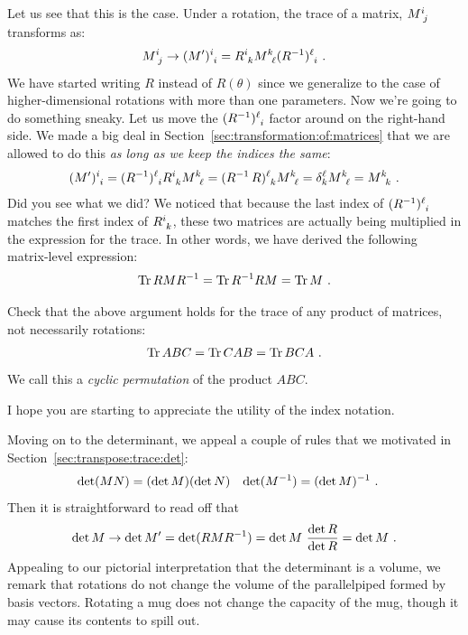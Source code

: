 \documentclass[12pt]{article}
\begin{document}
Let us see that this is the case. Under a rotation, the trace of a matrix, $M\aij{i}{j}$ transforms as:
\begin{align}
    M\aij{i}{j} \to (M')\aij{i}{i} = R\aij{i}{k} M\aij{k}{\ell} (R\inv)\aij{\ell}{i} \ .
\end{align}
We have started writing $R$ instead of $R(\theta)$ since we generalize to the case of higher-dimensional rotations with more than one parameters. Now we're going to do something sneaky. Let us move the $(R\inv)\aij{\ell}{i}$ factor around on the right-hand side. We made a big deal in Section~\ref{sec:transformation:of:matrices} that we are allowed to do this \emph{as long as we keep the indices the same}:
\begin{align}
    (M')\aij{i}{i}
    =
    (R\inv)\aij{\ell}{i} R\aij{i}{k} M\aij{k}{\ell} 
    = (R\inv\, R)\aij{\ell}{k} M\aij{k}{\ell} 
    = \delta^\ell_k M\aij{k}{\ell} 
    = M\aij{k}{k} \ . 
\end{align}
Did you see what we did? We noticed that because the last index of $(R\inv)\aij{\ell}{i}$ matches the first index of $R\aij{i}{k}$, these two matrices are actually being multiplied in the expression for the trace. In other words, we have derived the following matrix-level expression:
\begin{align}
    \textnormal{Tr}\, R M R^{-1} = \textnormal{Tr}\, R^{-1} R M = \textnormal{Tr}\, M \ .
\end{align}
\begin{exercise}
Check that the above argument holds for the trace of any product of matrices, not necessarily rotations:
\begin{align}
    \textnormal{Tr}\, ABC = \textnormal{Tr}\, CAB = \textnormal{Tr}\, BCA \ .
\end{align}
We call this a \emph{cyclic permutation} of the product $ABC$.
\end{exercise}
I hope you are starting to appreciate the utility of the index notation.

Moving on to the determinant, we appeal a couple of rules that we motivated in Section~\ref{sec:transpose:trace:det}: 
\begin{align}
    \det(MN) &= (\det M)(\det N)
    &
    \det(M^{-1} ) &= (\det M)^{-1}  \ .
\end{align}
Then it is straightforward to read off that
\begin{align}
    \det M \to \det M' = \det(RMR^{-1} ) = \det M\ \frac{\det R}{\det R} = \det M \ .
\end{align}
Appealing to our pictorial interpretation that the determinant is a volume, we remark that rotations do not change the volume of the parallelpiped formed by basis vectors. Rotating a mug does not change the capacity of the mug, though it may cause its contents to spill out. 
\end{document}
